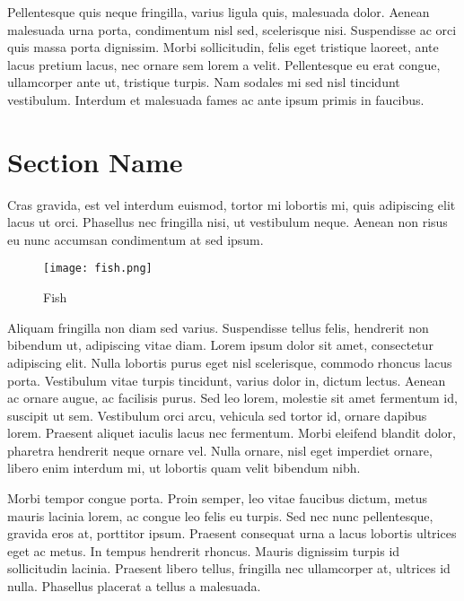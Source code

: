\documentclass[a4paper,11pt]{article}
\begin{document}
Pellentesque quis neque fringilla, varius ligula quis, malesuada dolor. Aenean malesuada urna porta, condimentum nisl sed, scelerisque nisi. Suspendisse ac orci quis massa porta dignissim. Morbi sollicitudin, felis eget tristique laoreet, ante lacus pretium lacus, nec ornare sem lorem a velit. Pellentesque eu erat congue, ullamcorper ante ut, tristique turpis. Nam sodales mi sed nisl tincidunt vestibulum. Interdum et malesuada fames ac ante ipsum primis in faucibus.


\section*{Section Name}

Cras gravida, est vel interdum euismod, tortor mi lobortis mi, quis adipiscing elit lacus ut orci. Phasellus nec fringilla nisi, ut vestibulum neque. Aenean non risus eu nunc accumsan condimentum at sed ipsum.
\begin{wrapfigure}{l}{0.4\textwidth} %
\begin{center}
\texttt{[image: fish.png]}
\end{center}
\caption{Fish}
\end{wrapfigure}
Aliquam fringilla non diam sed varius. Suspendisse tellus felis, hendrerit non bibendum ut, adipiscing vitae diam. Lorem ipsum dolor sit amet, consectetur adipiscing elit. Nulla lobortis purus eget nisl scelerisque, commodo rhoncus lacus porta. Vestibulum vitae turpis tincidunt, varius dolor in, dictum lectus. Aenean ac ornare augue, ac facilisis purus. Sed leo lorem, molestie sit amet fermentum id, suscipit ut sem. Vestibulum orci arcu, vehicula sed tortor id, ornare dapibus lorem. Praesent aliquet iaculis lacus nec fermentum. Morbi eleifend blandit dolor, pharetra hendrerit neque ornare vel. Nulla ornare, nisl eget imperdiet ornare, libero enim interdum mi, ut lobortis quam velit bibendum nibh.

Morbi tempor congue porta. Proin semper, leo vitae faucibus dictum, metus mauris lacinia lorem, ac congue leo felis eu turpis. Sed nec nunc pellentesque, gravida eros at, porttitor ipsum. Praesent consequat urna a lacus lobortis ultrices eget ac metus. In tempus hendrerit rhoncus. Mauris dignissim turpis id sollicitudin lacinia. Praesent libero tellus, fringilla nec ullamcorper at, ultrices id nulla. Phasellus placerat a tellus a malesuada.
\end{document}
